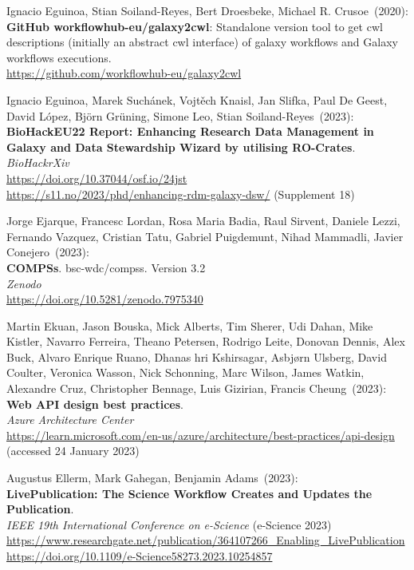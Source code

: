 \begin{thebibliography}{9}
Ignacio Eguinoa, Stian Soiland-Reyes, Bert Droesbeke, Michael R. Crusoe~(2020): \\
\textbf{GitHub workflowhub-eu/galaxy2cwl}: Standalone version tool to
get cwl descriptions (initially an abstract cwl interface) of galaxy
workflows and Galaxy workflows executions.\\
\url{https://github.com/workflowhub-eu/galaxy2cwl}

Ignacio Eguinoa, Marek Suchánek, Vojtěch Knaisl, Jan Slifka, Paul De Geest, David López, Björn Grüning, Simone Leo, Stian Soiland-Reyes~(2023): \\
\textbf{BioHackEU22 Report: Enhancing Research Data Management in Galaxy and Data Stewardship Wizard by utilising RO-Crates}.\\
\emph{BioHackrXiv}\\
\url{https://doi.org/10.37044/osf.io/24jst}\\
\url{https://s11.no/2023/phd/enhancing-rdm-galaxy-dsw/} (Supplement 18)


Jorge Ejarque, Francesc Lordan, Rosa Maria Badia, Raul Sirvent, Daniele Lezzi, Fernando Vazquez, Cristian Tatu,  Gabriel Puigdemunt, Nihad Mammadli, Javier Conejero~(2023): \\
\textbf{COMPSs}. bsc-wdc/compss. Version 3.2\\
\emph{Zenodo} \\
\url{https://doi.org/10.5281/zenodo.7975340}

Martin Ekuan, Jason Bouska, Mick Alberts, Tim Sherer, Udi Dahan, Mike Kistler, Navarro Ferreira, Theano Petersen, Rodrigo Leite, Donovan Dennis, Alex Buck, Alvaro Enrique Ruano, Dhanas hri Kshirsagar, Asbjørn Ulsberg, David Coulter, Veronica Wasson, Nick Schonning, Marc Wilson, James Watkin, Alexandre Cruz, Christopher Bennage, Luis Gizirian, Francis Cheung~(2023): \\
\textbf{Web {API} design best practices}.\\
\emph{Azure Architecture Center}\\
\url{https://learn.microsoft.com/en-us/azure/architecture/best-practices/api-design}
(accessed 24 January 2023)

Augustus Ellerm, Mark Gahegan, Benjamin Adams~(2023):\\
\textbf{LivePublication: The Science Workflow Creates and Updates the Publication}.\\
\emph{IEEE 19th International Conference on e-Science} (e-Science 2023) \\
\url{https://www.researchgate.net/publication/364107266_Enabling_LivePublication} \\
\url{https://doi.org/10.1109/e-Science58273.2023.10254857}


\end{thebibliography}
